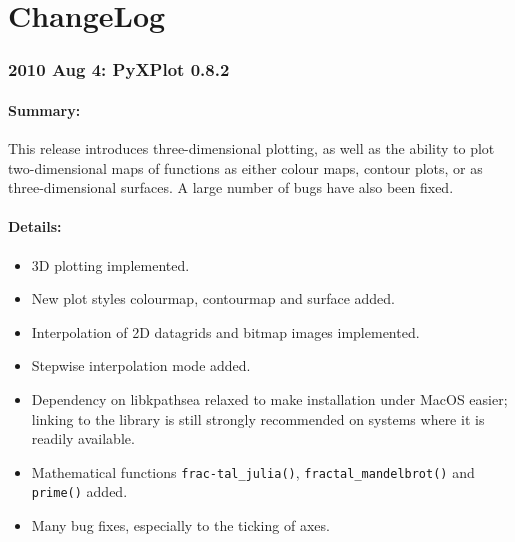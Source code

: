 %
%
%
%
%



\chapter{ChangeLog}

\subsection*{2010 Aug 4: PyXPlot 0.8.2}

\subsubsection*{Summary:}

This release introduces three-dimensional plotting, as well as the ability to plot two-dimensional maps of functions as either colour maps, contour plots, or as three-dimensional surfaces. A large number of bugs have also been fixed.

\subsubsection*{Details:}

\begin{itemize}
\item 3D plotting implemented.
\item New plot styles colourmap, contourmap and surface added.
\item Interpolation of 2D datagrids and bitmap images implemented.
\item Stepwise interpolation mode added.
\item Dependency on libkpathsea relaxed to make installation under MacOS easier; linking to the library is still strongly recommended on systems where it is readily available.
\item Mathematical functions {\tt frac-tal\_\-julia()}, {\tt frac\-tal\_\-man\-del\-brot()} and {\tt prime()} added.
\item Many bug fixes, especially to the ticking of axes.
\end{itemize}

